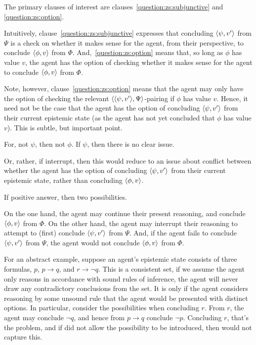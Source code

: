 \begin{note}
  The primary clauses of interest are clauses~\ref{question:zs:subjunctive} and \ref{question:zs:option}.

  Intuitively, clause~\ref{question:zs:subjunctive} expresses that concluding \(\langle \psi, v' \rangle\) from \(\Psi\) is a check on whether it makes sense for the agent, from their perspective, to conclude \(\langle \phi, v \rangle\) from \(\Phi\).
  And,~\ref{question:zs:option} means that, so long as \(\phi\) has value \(v\), the agent has the option of checking whether it makes sense for the agent to conclude \(\langle \phi, v \rangle\) from \(\Phi\).

  Note, however, clause~\ref{question:zs:option} means that the agent may only have the option of checking the relevant \(\langle \langle \psi, v' \rangle, \Psi \rangle\)-pairing if \(\phi\) has value \(v\).
  Hence, it need not be the case that the agent has the option of concluding \(\langle \psi, v' \rangle\) from their current epistemic state (as the agent has not yet concluded that \(\phi\) has value \(v\)).
  This is subtle, but important point.

  For, not \(\psi\), then not \(\phi\).
  If \(\psi\), then there is no clear issue.

  Or, rather, if interrupt, then this would reduce to an issue about conflict between whether the agent has the option of concluding \(\langle \psi, v' \rangle\) from their current epistemic state, rather than concluding \(\langle \phi, v \rangle\).

  If positive answer, then two possibilities.

  On the one hand, the agent may continue their present reasoning, and conclude \(\langle \phi, v \rangle\) from \(\Phi\).
  On the other hand, the agent may interrupt their reasoning to attempt to (first) conclude \(\langle \psi, v' \rangle\) from \(\Psi\).
  And, if the agent fails to conclude \(\langle \psi, v' \rangle\) from \(\Psi\), the agent would not conclude \(\langle \phi, v \rangle\) from \(\Phi\).

  For an abstract example, suppose an agent's epistemic state consists of three formulas, \(p\), \(p \rightarrow q\), and \(r \rightarrow \lnot q\).
  This is a consistent set, if we assume the agent only reasons in accordance with sound rules of inference, the agent will never draw any contradictory conclusions from the set.
  It is only if the agent considers reasoning by some unsound rule that the agent would be presented with distinct options.
  In particular, consider the possibilities when concluding \(r\).
  From \(r\), the agent may conclude \(\lnot q\), and hence from \(p \rightarrow q\) conclude \(\lnot p\).
  Concluding \(r\), that's the problem, and if did not allow the possibility to be introduced, then would not capture this.


\end{note}
